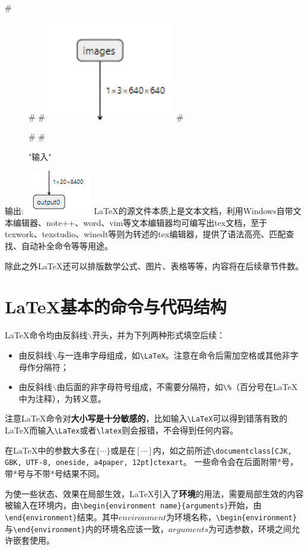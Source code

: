 #\begin{figure}[htbp]
#    \centering
#	\includegraphics[width=0.5\textwidth]{figures/inputs.png}
#	\caption{"输入"}
#    \label{fig:input}
#\end{figure}
输出:
\includegraphics{figures/output.png}
\LaTeX 的源文件本质上是文本文档，利用Windows自带文本编辑器、note++、word、vim等文本编辑器均可编写出tex文档，至于texwork、texstudio、winedt等则为转述的tex编辑器，提供了语法高亮、匹配查找、自动补全命令等等用途。

除此之外\LaTeX 还可以排版数学公式、图片、表格等等，内容将在后续章节件数。
\section{\LaTeX 基本的命令与代码结构}
\LaTeX 命令均由反斜线$\backslash$开头，并为下列两种形式填空后续：
\begin{itemize}
\item 由反斜线$\backslash$与一连串字母组成，如\verb|\LaTeX|。注意在命令后需加空格或其他非字母作分隔符；
\item 由反斜线$\backslash$由后面的非字母符号组成，不需要分隔符，如\verb|\%|（百分号在\LaTeX 中为注释），为转义意。
\end{itemize}

注意\LaTeX 命令对\textbf{大小写是十分敏感的}，比如输入\verb|\LaTeX|可以得到错落有致的\LaTeX 而输入\verb|\LaTex|或者\verb|\latex|则会报错，不会得到任何内容。

在\LaTeX 中的参数大多在$\{\cdots\}$或是在$[\cdots]$内，如之前所述\verb|\documentclass|\texttt{[CJK, GBK, UTF-8, oneside, a4paper, 12pt]{ctexart}}。
一些命令会在后面附带*号，带*号与不带*号结果不同。

为使一些状态、效果在局部生效，\LaTeX 引入了\textbf{环境}的用法，需要局部生效的内容被输入在环境内，由\verb|\begin{environment name}{arguments}|开始，由\verb|\end{environment}|结束。其中$environment$为环境名称，\verb|\begin{environment}|与\verb|\end{environment}|内的环境名应该一致，$arguments$为可选参数，环境之间允许嵌套使用。
